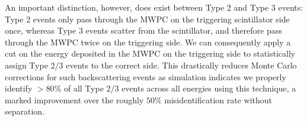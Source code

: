 An important distinction, however, does exist between Type 2 and Type 3 events:
Type 2 events only pass through the MWPC on the
triggering scintillator side once, whereas Type 3 events scatter from
the scintillator, and therefore pass through the MWPC twice on
the triggering side. We can consequently apply a cut on the energy deposited in
the MWPC on the triggering side to statistically assign
Type 2/3 events to the correct side.
This drastically reduces
Monte Carlo corrections for such backscattering events as simulation indicates we
properly identify $>80\%$ of all Type 2/3 events across all energies using this
technique, a marked
improvement over the roughly $50\%$ misidentification rate without separation.








